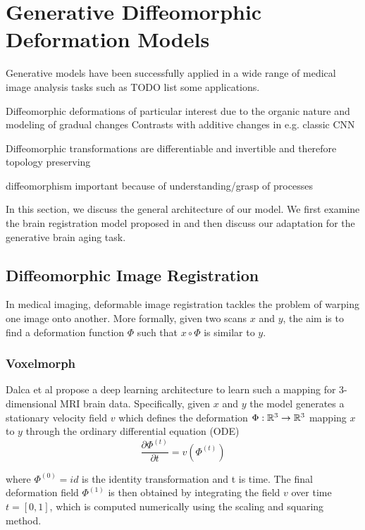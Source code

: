 \chapter{Generative Diffeomorphic Deformation Models}
Generative models have been successfully applied in a wide range of medical image analysis tasks such as TODO list some applications. 

Diffeomorphic deformations of particular interest due to the organic nature and modeling of gradual changes
Contrasts with additive changes in e.g. classic CNN

Diffeomorphic transformations are differentiable and invertible and therefore topology preserving

diffeomorphism important because of understanding/grasp of processes


In this section, we discuss the general architecture of our model. We first examine the brain registration model proposed in \cite{voxelmorph} and then discuss our adaptation for the generative brain aging task.

\section{Diffeomorphic Image Registration}
\label{chap:voxelmorph}
In medical imaging, deformable image registration tackles the problem of warping one image onto another. More formally, given two scans $x$ and $y$, the aim is to find a deformation function $\Phi$ such that $x \circ \Phi$ is similar to $y$.

\subsection{Voxelmorph}
Dalca et al propose a deep learning architecture to learn such a mapping for 3-dimensional MRI brain data. Specifically, given $x$ and $y$ the model generates a stationary velocity field $v$ which defines the deformation ${\Phi : \mathbb{R}^3 \rightarrow \mathbb{R}^3}$ mapping $x$ to $y$ through the ordinary differential equation (ODE)
\begin{equation} \label{eq:voxODE}
	\frac{\partial \Phi^{(t)}}{\partial t} = v(\Phi^{(t)})
\end{equation}

where $\Phi^{(0)} = id$ is the identity transformation and t is time.
The final deformation field $\Phi^{(1)}$ is then obtained by integrating the field $v$ over time $t = [0, 1]$, which is computed numerically using the scaling and squaring method.

